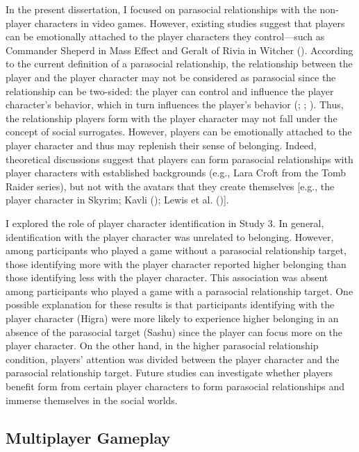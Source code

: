 \documentclass[
]{udthesis}
\begin{document}
In the present dissertation, I focused on parasocial relationships with
the non-player characters in video games. However, existing studies
suggest that players can be emotionally attached to the player
characters they control---such as Commander Sheperd in Mass Effect and
Geralt of Rivia in Witcher (). According to the current
definition of a parasocial relationship, the relationship between the
player and the player character may not be considered as parasocial
since the relationship can be two-sided: the player can control and
influence the player character's behavior, which in turn influences the
player's behavior (; ; ). Thus, the
relationship players form with the player character may not fall under
the concept of social surrogates. However, players can be emotionally
attached to the player character and thus may replenish their sense of
belonging. Indeed, theoretical discussions suggest that players can form
parasocial relationships with player characters with established
backgrounds (e.g., Lara Croft from the Tomb Raider series), but not with
the avatars that they create themselves {[}e.g., the player character in
Skyrim; Kavli (); Lewis et al. (){]}.

I explored the role of player character identification in Study 3. In
general, identification with the player character was unrelated to
belonging. However, among participants who played a game without a
parasocial relationship target, those identifying more with the player
character reported higher belonging than those identifying less with the
player character. This association was absent among participants who
played a game with a parasocial relationship target. One possible
explanation for these results is that participants identifying with the
player character (Higra) were more likely to experience higher belonging
in an absence of the parasocial target (Sashu) since the player can
focus more on the player character. On the other hand, in the higher
parasocial relationship condition, players' attention was divided
between the player character and the parasocial relationship target.
Future studies can investigate whether players benefit form from certain
player characters to form parasocial relationships and immerse
themselves in the social worlds.

\subsection{Multiplayer Gameplay}\label{multiplayer-gameplay}
\end{document}
